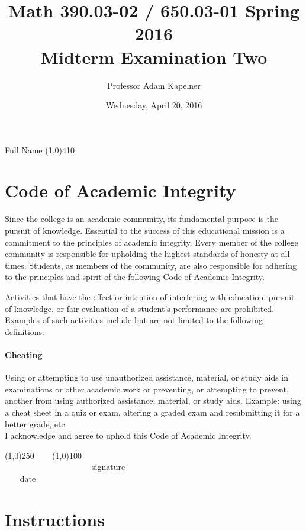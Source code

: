 \documentclass[12pt]{article}
\title{Math 390.03-02 / 650.03-01 Spring 2016 \\ Midterm Examination Two}
\author{Professor Adam Kapelner}
\date{Wednesday, April 20, 2016}
\begin{document}
\maketitle

\noindent Full Name \line(1,0){410}

\thispagestyle{empty}

\section*{Code of Academic Integrity}

\footnotesize
Since the college is an academic community, its fundamental purpose is the pursuit of knowledge. Essential to the success of this educational mission is a commitment to the principles of academic integrity. Every member of the college community is responsible for upholding the highest standards of honesty at all times. Students, as members of the community, are also responsible for adhering to the principles and spirit of the following Code of Academic Integrity.

Activities that have the effect or intention of interfering with education, pursuit of knowledge, or fair evaluation of a student's performance are prohibited. Examples of such activities include but are not limited to the following definitions:

\paragraph{Cheating} Using or attempting to use unauthorized assistance, material, or study aids in examinations or other academic work or preventing, or attempting to prevent, another from using authorized assistance, material, or study aids. Example: using a cheat sheet in a quiz or exam, altering a graded exam and resubmitting it for a better grade, etc.
\\

\noindent I acknowledge and agree to uphold this Code of Academic Integrity. \\

\begin{center}
\line(1,0){250} ~~~ \line(1,0){100}\\
~~~~~~~~~~~~~~~~~~~~~signature~~~~~~~~~~~~~~~~~~~~~~~~~~~~~~~~~~~~~~~~~~~~~ date
\end{center}

\normalsize

\section*{Instructions}
\end{document}

